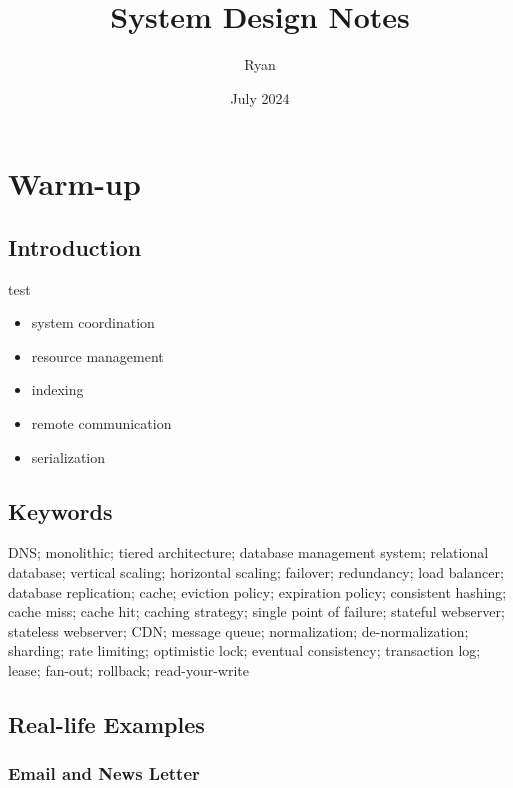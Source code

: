 \documentclass[letterpaper, oneside]{book}
\title{System Design Notes}
\author{Ryan}
\date{July 2024}
\theoremstyle{definition}
\theoremstyle{remark}
\begin{document}
\maketitle{}
\tableofcontents


\part{Warm-up}

\chapter{Introduction}

test
\begin{itemize}
    \item system coordination
    \item resource management
    \item indexing
    \item remote communication
    \item serialization
\end{itemize}

\chapter{Keywords}

DNS; monolithic; tiered architecture; database management system; relational database; vertical scaling; horizontal scaling; failover; redundancy; load balancer; database replication; cache; eviction policy; expiration policy; consistent hashing; cache miss; cache hit; caching strategy; single point of failure; stateful webserver; stateless webserver; CDN; message queue; normalization; de-normalization; sharding; rate limiting; optimistic lock; eventual consistency; transaction log; lease; fan-out; rollback; read-your-write

\chapter{Real-life Examples}

\section{Email and News Letter}
\end{document}
